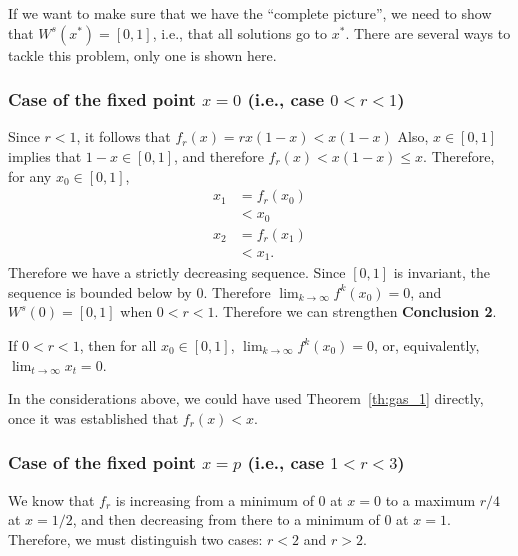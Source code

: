 If we want to make sure that we have the ``complete picture'', we need to show that $W^s(x^*)=[0,1]$, i.e., that all solutions go to $x^*$. There are several ways to tackle this problem, only one is shown here.

\subsubsection{Case of the fixed point $x=0$ (i.e., case $0<r<1$)}
Since $r<1$, it follows that $f_r(x)=r x(1-x)<x(1-x)$ Also, $x\in[0,1]$ implies that $1-x\in[0,1]$, and therefore $f_r(x)<x(1-x)\leq x$. Therefore, for any $x_0\in[0,1]$,
\begin{align*}
x_1 &= f_r(x_0) \\
&< x_0 \\
x_2 &= f_r(x_1) \\
& < x_1.
\end{align*}
Therefore we have a strictly decreasing sequence. Since $[0,1]$ is invariant, the sequence is bounded below by $0$. Therefore $\lim_{k\to\infty}f^k(x_0)=0$, and $W^s(0)=[0,1]$ when $0<r<1$. Therefore we can strengthen {\bf Conclusion 2}.

 If $0<r<1$, then for all $x_0\in[0,1]$, $\lim_{k\to\infty}f^k(x_0)=0$, or, equivalently, $\lim_{t\to\infty}x_t=0$.

\begin{remark}
In the considerations above, we could have used Theorem~\ref{th:gas_1} directly, once it was established that $f_r(x)<x$.
\end{remark}
 

\subsubsection{Case of the fixed point $x=p$ (i.e., case $1<r<3$)}
We know that $f_r$ is increasing from a minimum of 0 at $x=0$ to a maximum $r/4$ at $x=1/2$, and then decreasing from there to a minimum of 0 at $x=1$. Therefore, we must distinguish two cases: $r<2$ and $r>2$.


